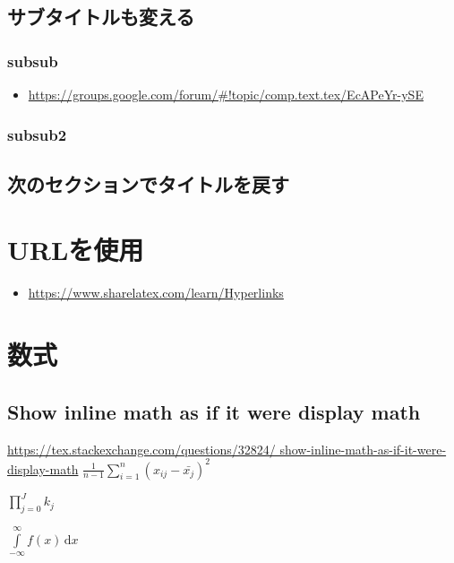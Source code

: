 \documentclass{jsarticle}	       %
\begin{document}
		\subsection{サブタイトルも変える}
			\subsubsection{subsub}
				\begin{itemize}
					\item \url{
						https://groups.google.com/forum/#!topic/comp.text.tex/EcAPeYr-ySE}
				\end{itemize}
			\subsubsection*{subsub2}
		\subsection{次のセクションでタイトルを戻す}

	\let\thesection=\oldthesection
	\let\thesubsection=\oldthesubsection
	\section{URLを使用}
		\begin{itemize}
			\item \url{https://www.sharelatex.com/learn/Hyperlinks}
		\end{itemize}
	
	\section{数式} \label{数式}
		\subsection{Show inline math as if it were display math}
			\url{https://tex.stackexchange.com/questions/32824/
				show-inline-math-as-if-it-were-display-math}
			$\frac{1}{n-1} \sum\limits_{i=1}^{n} (x_{ij} - \bar{x_j})^2$
			
			$\prod\limits_{j=0}^J k_j$
			
			$\int\limits_{-\infty}^\infty f(x)\,\mathrm{d}x$
			
\end{document}
